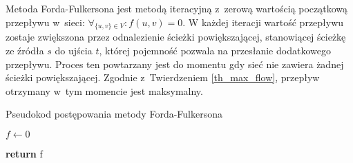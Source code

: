 \par{
  Metoda Forda-Fulkersona jest metodą iteracyjną z~zerową wartością początkową przepływu w~sieci: $\forall_{\{u,v\}\in V}: f(u,v)=0$.
  W każdej iteracji wartość przepływu zostaje zwiększona przez odnalezienie ścieżki powiększającej, stanowiącej ścieżkę ze źródła $s$ do ujścia $t$, której pojemność pozwala na przesłanie dodatkowego przepływu.
  Proces ten powtarzany jest do momentu gdy sieć nie zawiera żadnej ścieżki powiększającej.
  Zgodnie z~Twierdzeniem \ref{th_max_flow}, przepływ otrzymany w~tym momencie jest maksymalny.
  \begin{algorithm}
    \caption{Pseudokod postępowania metody Forda-Fulkersona}\label{alg_fordFulkerson}
    \begin{algorithmic}[1]



        \State $f \gets 0$

        \EndWhile
        \State\textbf{return} f
      \EndFunction
  \end{algorithmic}
  \end{algorithm}
}
